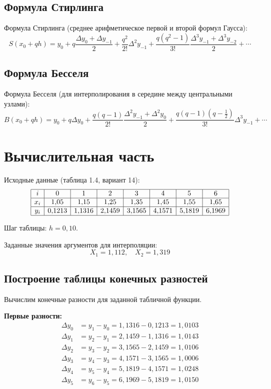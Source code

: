 \subsection{Формула Стирлинга}

Формула Стирлинга (среднее арифметическое первой и второй формул Гаусса):
\[
S(x_0 + qh) = y_0 + q\frac{\Delta y_0 + \Delta y_{-1}}{2} + \frac{q^2}{2!}\Delta^2 y_{-1} + \frac{q(q^2-1)}{3!}\frac{\Delta^3 y_{-1} + \Delta^3 y_{-2}}{2} + \cdots
\]

\subsection{Формула Бесселя}

Формула Бесселя (для интерполирования в середине между центральными узлами):
\[
B(x_0 + qh) = y_0 + q\Delta y_0 + \frac{q(q-1)}{2!}\frac{\Delta^2 y_{-1} + \Delta^2 y_0}{2} + \frac{q(q-1)(q-\frac{1}{2})}{3!}\Delta^3 y_{-1} + \cdots
\]

\section{Вычислительная часть}

Исходные данные (таблица 1.4, вариант 14):
\[
\begin{array}{|c|c|c|c|c|c|c|c|}
\hline
i & 0 & 1 & 2 & 3 & 4 & 5 & 6 \\
\hline
x_i & 1{,}05 & 1{,}15 & 1{,}25 & 1{,}35 & 1{,}45 & 1{,}55 & 1{,}65 \\
\hline
y_i & 0{,}1213 & 1{,}1316 & 2{,}1459 & 3{,}1565 & 4{,}1571 & 5{,}1819 & 6{,}1969 \\
\hline
\end{array}
\]

Шаг таблицы: $h = 0{,}10$.

Заданные значения аргументов для интерполяции:
\[
X_1 = 1{,}112,\quad X_2 = 1{,}319
\]

\subsection{Построение таблицы конечных разностей}

Вычислим конечные разности для заданной табличной функции.

\textbf{Первые разности:}
\begin{align*}
\Delta y_0 &= y_1 - y_0 = 1{,}1316 - 0{,}1213 = 1{,}0103 \\
\Delta y_1 &= y_2 - y_1 = 2{,}1459 - 1{,}1316 = 1{,}0143 \\
\Delta y_2 &= y_3 - y_2 = 3{,}1565 - 2{,}1459 = 1{,}0106 \\
\Delta y_3 &= y_4 - y_3 = 4{,}1571 - 3{,}1565 = 1{,}0006 \\
\Delta y_4 &= y_5 - y_4 = 5{,}1819 - 4{,}1571 = 1{,}0248 \\
\Delta y_5 &= y_6 - y_5 = 6{,}1969 - 5{,}1819 = 1{,}0150
\end{align*}

